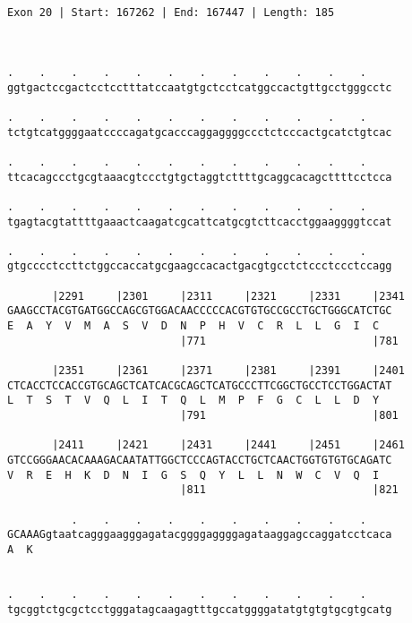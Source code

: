\documentclass{article}
\begin{document}
\begin{Verbatim}
                                       
 
Exon 20 | Start: 167262 | End: 167447 | Length: 185



.    .    .    .    .    .    .    .    .    .    .    .    
ggtgactccgactcctcctttatccaatgtgctcctcatggccactgttgcctgggcctc
                                                            
.    .    .    .    .    .    .    .    .    .    .    .    
tctgtcatggggaatccccagatgcacccaggaggggccctctcccactgcatctgtcac
                                                            
.    .    .    .    .    .    .    .    .    .    .    .    
ttcacagccctgcgtaaacgtccctgtgctaggtcttttgcaggcacagcttttcctcca
                                                            
.    .    .    .    .    .    .    .    .    .    .    .    
tgagtacgtattttgaaactcaagatcgcattcatgcgtcttcacctggaaggggtccat
                                                            
.    .    .    .    .    .    .    .    .    .    .    .    
gtgcccctccttctggccaccatgcgaagccacactgacgtgcctctccctccctccagg
                                                            
       |2291     |2301     |2311     |2321     |2331     |2341
GAAGCCTACGTGATGGCCAGCGTGGACAACCCCCACGTGTGCCGCCTGCTGGGCATCTGC
E  A  Y  V  M  A  S  V  D  N  P  H  V  C  R  L  L  G  I  C  
                           |771                          |781
  
       |2351     |2361     |2371     |2381     |2391     |2401
CTCACCTCCACCGTGCAGCTCATCACGCAGCTCATGCCCTTCGGCTGCCTCCTGGACTAT
L  T  S  T  V  Q  L  I  T  Q  L  M  P  F  G  C  L  L  D  Y  
                           |791                          |801
  
       |2411     |2421     |2431     |2441     |2451     |2461
GTCCGGGAACACAAAGACAATATTGGCTCCCAGTACCTGCTCAACTGGTGTGTGCAGATC
V  R  E  H  K  D  N  I  G  S  Q  Y  L  L  N  W  C  V  Q  I  
                           |811                          |821
  
          .    .    .    .    .    .    .    .    .    .    
GCAAAGgtaatcagggaagggagatacggggaggggagataaggagccaggatcctcaca
A  K                                                        
                                                            
  
.    .    .    .    .    .    .    .    .    .    .    .    
tgcggtctgcgctcctgggatagcaagagtttgccatggggatatgtgtgtgcgtgcatg
                                                            

\end{Verbatim}
\end{document}
